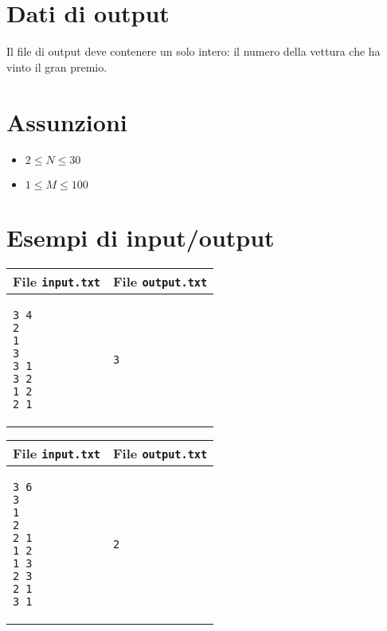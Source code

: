 \documentclass[a4paper,11pt]{article}
\begin{document}
\section*{Dati di output}
  
Il file di output deve contenere un solo intero: il numero della vettura
che ha vinto il gran premio.
    
\section*{Assunzioni}
\begin{itemize}
  \item $2 ≤ N ≤ 30$
  \item $1 ≤ M ≤ 100$
\end{itemize}

\section*{Esempi di input/output}
    \noindent
    \begin{tabular}{p{11cm}|p{5cm}}
    \toprule
    \textbf{File \texttt{input.txt}}
    & \textbf{File \texttt{output.txt}}
    \\
    \midrule
    \scriptsize
    \begin{verbatim}
3 4
2
1
3
3 1
3 2
1 2
2 1
      \end{verbatim}
    &
    \scriptsize
    \begin{verbatim}
3
      \end{verbatim}
    \\
    \bottomrule
    \end{tabular}
  
    \noindent
    \begin{tabular}{p{11cm}|p{5cm}}
    \toprule
    \textbf{File \texttt{input.txt}}
    & \textbf{File \texttt{output.txt}}
    \\
    \midrule
    \scriptsize
    \begin{verbatim}
3 6
3
1
2
2 1
1 2
1 3
2 3
2 1
3 1
      \end{verbatim}
    &
    \scriptsize
    \begin{verbatim}
2
      \end{verbatim}
    \\
    \bottomrule
    \end{tabular}
\end{document}
